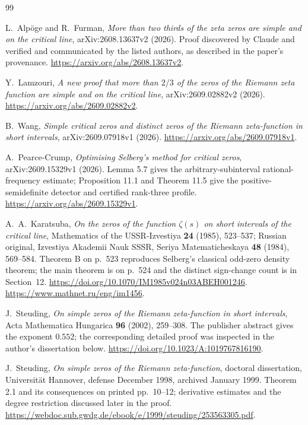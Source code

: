 \documentclass[11pt]{article}
\theoremstyle{remark}
\begin{document}
\begin{thebibliography}{99}\small\raggedright

L.~Alp\"oge and R.~Furman,
\emph{More than two thirds of the zeta zeros are simple and on the
critical line}, arXiv:2608.13637v2 (2026).
Proof discovered by Claude and verified and communicated by the listed %
authors, as described in the paper's provenance.
\url{https://arxiv.org/abs/2608.13637v2}.

Y.~Lamzouri,
\emph{A new proof that more than $2/3$ of the zeros of the Riemann zeta
function are simple and on the critical line}, arXiv:2609.02882v2 (2026).
\url{https://arxiv.org/abs/2609.02882v2}.

B.~Wang,
\emph{Simple critical zeros and distinct zeros of the Riemann
zeta-function in short intervals}, arXiv:2609.07918v1 (2026).
\url{https://arxiv.org/abs/2609.07918v1}.

A.~Pearce-Crump,
\emph{Optimising Selberg's method for critical zeros},
arXiv:2609.15329v1 (2026). Lemma 5.7 gives the arbitrary-subinterval
rational-frequency estimate; Proposition 11.1 and Theorem 11.5 give the
positive-semidefinite detector and certified rank-three profile.
\url{https://arxiv.org/abs/2609.15329v1}.

A.~A.~Karatsuba,
\emph{On the zeros of the function $\zeta(s)$ on short intervals of the
critical line}, Mathematics of the USSR-Izvestiya \textbf{24} (1985),
523--537; Russian original, Izvestiya Akademii Nauk SSSR, Seriya
Matematicheskaya \textbf{48} (1984), 569--584. Theorem B on p.~523
reproduces Selberg's classical odd-zero density theorem; the main theorem
is on p.~524 and the distinct sign-change count is in Section~12.
\url{https://doi.org/10.1070/IM1985v024n03ABEH001246}.
\url{https://www.mathnet.ru/eng/im1456}.

J.~Steuding,
\emph{On simple zeros of the Riemann zeta-function in short intervals},
Acta Mathematica Hungarica \textbf{96} (2002), 259--308.
The publisher abstract gives the exponent $0.552$; the corresponding
detailed proof was inspected in the author's dissertation below.
\url{https://doi.org/10.1023/A:1019767816190}.

J.~Steuding,
\emph{On simple zeros of the Riemann zeta-function},
doctoral dissertation, Universit\"at Hannover, defense December 1998,
archived January 1999. Theorem 2.1 and its consequences on printed
pp.~10--12; derivative estimates and the degree restriction discussed
later in the proof.
\url{https://webdoc.sub.gwdg.de/ebook/e/1999/steuding/253563305.pdf}.


\end{thebibliography}
\end{document}
